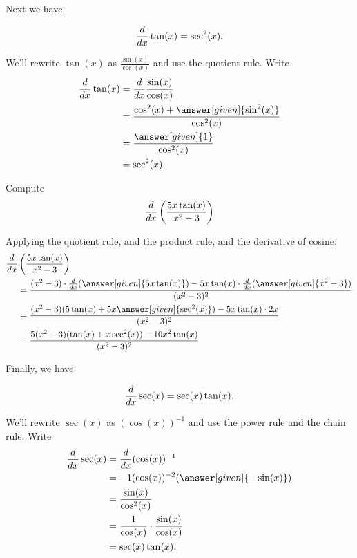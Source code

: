 \documentclass{ximera}
\begin{document}
Next we have:

\begin{theorem}
\[
\frac{d}{dx} \tan(x) = \sec^2(x).
\]

\begin{explanation}
We'll rewrite $\tan(x)$ as $\frac{\sin(x)}{\cos(x)}$ and use the quotient rule. Write
\begin{align*}
\ddx\tan(x) &= \ddx\frac{\sin(x)}{\cos(x)}\\
&=\frac{\cos^2(x) + \answer[given]{\sin^2(x)}}{\cos^2(x)}\\
&=\frac{\answer[given]{1}}{\cos^2(x)}\\
&=\sec^2(x).
\end{align*}
\end{explanation}
\end{theorem}

\begin{example}
Compute
\[
\frac{d}{dx} \left( \frac{5x \tan(x)}{x^2 - 3} \right)
\]
\begin{explanation}
Applying the quotient rule, and the product rule, and the derivative
of cosine:
\begin{align*}
  \ddx &\left( \frac{5x \tan(x)}{x^2 - 3} \right) \\
  &= \frac{(x^2 - 3) \cdot \ddx(\answer[given]{5x \tan(x)}) - 5x \tan(x) \cdot \ddx (\answer[given]{x^2 - 3})}{(x^2 - 3)^2}  \\
  &= \frac{(x^2 - 3)(5 \tan(x) + 5x \answer[given]{\sec^2(x)}) - 5x \tan(x) \cdot 2x}{(x^2 - 3)^2}  \\
  &= \frac{5(x^2-3)(\tan(x)+x \sec^2(x)) - 10x^2 \tan(x)}{(x^2-3)^2}
\end{align*}
\end{explanation}
\end{example}

Finally, we have

\begin{theorem}
\[
\frac{d}{dx} \sec(x) = \sec(x)\tan(x).
\]


\begin{explanation}
We'll rewrite $\sec(x)$ as $(\cos(x))^{-1}$ and use the power rule and the chain rule. Write
\begin{align*}
\ddx \sec(x) &= \ddx(\cos (x))^{-1}\\
&=-1(\cos(x))^{-2}(\answer[given]{-\sin(x)}) \\
&= \frac{\sin(x)}{\cos^2(x)} \\
&= \frac{1}{\cos(x)} \cdot \frac{\sin(x)}{\cos(x)}  \\
&= \sec(x)\tan(x).
\end{align*}
\end{explanation}
\end{theorem}
\end{document}
